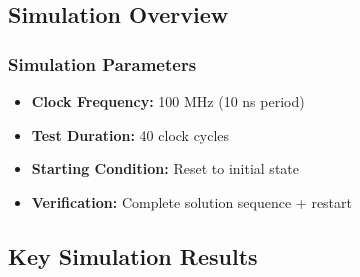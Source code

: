 \documentclass[12pt,letterpaper]{article}
\begin{document}
\subsection{Simulation Overview}

\subsubsection{Simulation Parameters}
\begin{itemize}
    \item \textbf{Clock Frequency:} 100 MHz (10 ns period)
    \item \textbf{Test Duration:} 40 clock cycles
    \item \textbf{Starting Condition:} Reset to initial state
    \item \textbf{Verification:} Complete solution sequence + restart
\end{itemize}

\subsection{Key Simulation Results}
\end{document}
